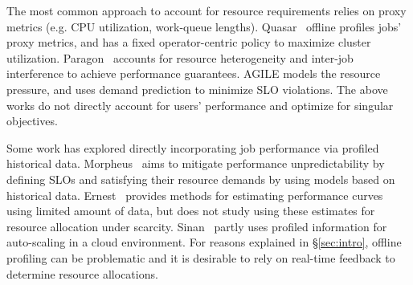 The most common approach to account for resource requirements relies on proxy metrics (e.g. CPU utilization, work-queue lengths).
Quasar~\cite{delimitrou2014quasar} 
offline profiles jobs' proxy metrics,
and has a fixed operator-centric policy to maximize cluster
utilization.
Paragon~\cite{delimitrou2013paragon} accounts for resource heterogeneity and inter-job interference
 to achieve performance guarantees.
AGILE\cite{nguyen2013AGILEED} models the resource pressure, and uses demand prediction to minimize SLO violations.
The above works do not directly account for users' performance  and optimize for singular objectives.


% 

Some work has explored directly incorporating job performance
via profiled historical data.
Morpheus~\cite{morpheus} aims to mitigate performance unpredictability by
defining SLOs and satisfying their resource demands by using models based on historical data.
Ernest~\cite{venkataraman2016ernest} provides methods for estimating performance curves using
limited amount of data, but does not study using these estimates for
resource allocation under scarcity.
Sinan~\cite{zhang2021sinan} partly
uses profiled information for auto-scaling in a cloud environment.
For reasons explained in \S\ref{sec:intro}, offline profiling can be problematic
and it is desirable to rely on real-time feedback to determine resource allocations.


